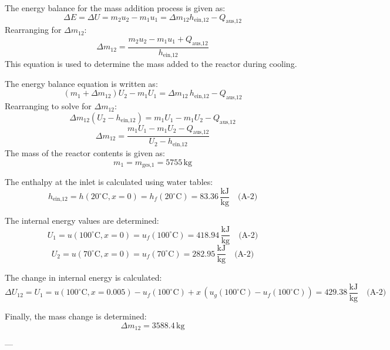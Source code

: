 The energy balance for the mass addition process is given as:  
\[
\Delta E = \Delta U = m_2 u_2 - m_1 u_1 = \Delta m_{12} h_{\text{ein,12}} - Q_{\text{aus,12}}
\]  
Rearranging for \( \Delta m_{12} \):  
\[
\Delta m_{12} = \frac{m_2 u_2 - m_1 u_1 + Q_{\text{aus,12}}}{h_{\text{ein,12}}}
\]  
This equation is used to determine the mass added to the reactor during cooling.

The energy balance equation is written as:  
\[
(m_1 + \Delta m_{12}) U_2 - m_1 U_1 = \Delta m_{12} \, h_{\text{ein,12}} - Q_{\text{aus,12}}
\]  
Rearranging to solve for \( \Delta m_{12} \):  
\[
\Delta m_{12} (U_2 - h_{\text{ein,12}}) = m_1 U_1 - m_1 U_2 - Q_{\text{aus,12}}
\]  
\[
\Delta m_{12} = \frac{m_1 U_1 - m_1 U_2 - Q_{\text{aus,12}}}{U_2 - h_{\text{ein,12}}}
\]  
The mass of the reactor contents is given as:  
\[
m_1 = m_{\text{ges,1}} = 5755 \, \text{kg}
\]  

The enthalpy at the inlet is calculated using water tables:  
\[
h_{\text{ein,12}} = h(20^\circ\text{C}, x=0) = h_f(20^\circ\text{C}) = 83.36 \, \frac{\text{kJ}}{\text{kg}} \quad \text{(A-2)}
\]  

The internal energy values are determined:  
\[
U_1 = u(100^\circ\text{C}, x=0) = u_f(100^\circ\text{C}) = 418.94 \, \frac{\text{kJ}}{\text{kg}} \quad \text{(A-2)}
\]  
\[
U_2 = u(70^\circ\text{C}, x=0) = u_f(70^\circ\text{C}) = 282.95 \, \frac{\text{kJ}}{\text{kg}} \quad \text{(A-2)}
\]  

The change in internal energy is calculated:  
\[
\Delta U_{12} = U_1 = u(100^\circ\text{C}, x=0.005) - u_f(100^\circ\text{C}) + x \, (u_g(100^\circ\text{C}) - u_f(100^\circ\text{C})) = 429.38 \, \frac{\text{kJ}}{\text{kg}} \quad \text{(A-2)}
\]  

Finally, the mass change is determined:  
\[
\Delta m_{12} = 3588.4 \, \text{kg}
\]  

---